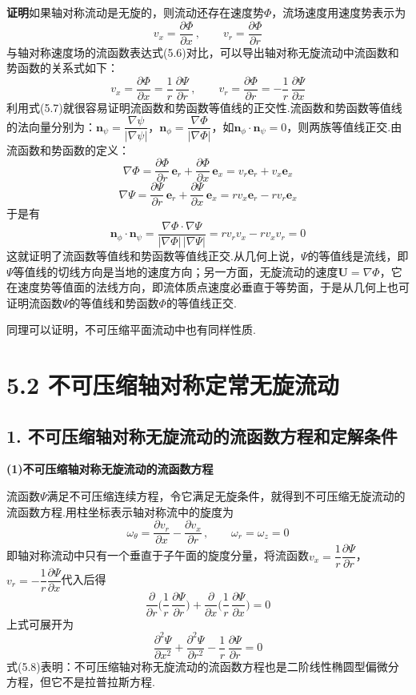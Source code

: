 \textbf{证明}\quad 如果轴对称流动是无旋的，则流动还存在速度势$\Phi$，流场速度用速度势表示为
\[
v_x=\frac{\partial\Phi}{\partial x}\,,\qquad v_r=\frac{\partial\Phi}{\partial r}
\]
与轴对称速度场的流函数表达式(5.6)对比，可以导出轴对称无旋流动中流函数和势函数的关系式如下：
\begin{equation*}
v_x=\frac{\partial\Phi}{\partial x}=\frac{1}{r}\,\frac{\partial\Psi}{\partial r}\,,\qquad v_r=\frac{\partial\Phi}{\partial r}=-\frac{1}{r}\,\frac{\partial\Psi}{\partial x}
\tag{5.7}
\end{equation*}
利用式(5.7)就很容易证明流函数和势函数等值线的正交性.流函数和势函数等值线的法向量分别为：$\boldsymbol{n}_\psi=\dfrac{\nabla\psi}{|\nabla\psi|}$，$\boldsymbol{n}_\phi=\dfrac{\nabla\Phi}{|\nabla\Phi|}$，如$\boldsymbol{n}_\phi\cdot\boldsymbol{n}_\psi=0$，则两族等值线正交.由流函数和势函数的定义：
\[
\nabla\Phi=\frac{\partial\Phi}{\partial r}\,\boldsymbol{e}_r+\frac{\partial\Phi}{\partial x}\,\boldsymbol{e}_x=v_r\boldsymbol{e}_r+v_x\boldsymbol{e}_x
\]
\[
\nabla\Psi=\frac{\partial\Psi}{\partial r}\,\boldsymbol{e}_r+\frac{\partial\Psi}{\partial x}\,\boldsymbol{e}_x=rv_x\boldsymbol{e}_r-rv_r\boldsymbol{e}_x
\]
于是有
\[
\boldsymbol{n}_\phi\cdot\boldsymbol{n}_\psi=\frac{\nabla\Phi\cdot\nabla\Psi}{|\nabla\Phi|\,|\nabla\Psi|}=rv_r v_x-rv_x v_r=0
\]
这就证明了流函数等值线和势函数等值线正交.从几何上说，$\Psi$的等值线是流线，即$\Psi$等值线的切线方向是当地的速度方向；另一方面，无旋流动的速度$\boldsymbol{U}=\nabla\Phi$，它在速度势等值面的法线方向，即流体质点速度必垂直于等势面，于是从几何上也可证明流函数$\Psi$的等值线和势函数$\Phi$的等值线正交.

同理可以证明，不可压缩平面流动中也有同样性质.

\section*{5.2  不可压缩轴对称定常无旋流动}

\subsection*{1. 不可压缩轴对称无旋流动的流函数方程和定解条件}

\textbf{(1)不可压缩轴对称无旋流动的流函数方程}

流函数$\Psi$满足不可压缩连续方程，令它满足无旋条件，就得到不可压缩无旋流动的流函数方程.用柱坐标表示轴对称流中的旋度为
\[
\omega_\theta=\frac{\partial v_r}{\partial x}-\frac{\partial v_x}{\partial r}\,,\qquad \omega_r=\omega_z=0
\]
即轴对称流动中只有一个垂直于子午面的旋度分量，将流函数$v_x=\dfrac{1}{r}\dfrac{\partial\Psi}{\partial r}$，$v_r=-\dfrac{1}{r}\dfrac{\partial\Psi}{\partial x}$代入后得
\[
\frac{\partial}{\partial r}\Big(\frac{1}{r}\,\frac{\partial\Psi}{\partial r}\Big)+\frac{\partial}{\partial x}\Big(\frac{1}{r}\,\frac{\partial\Psi}{\partial x}\Big)=0
\]
上式可展开为
\begin{equation*}
\frac{\partial^{2}\Psi}{\partial x^{2}}+\frac{\partial^{2}\Psi}{\partial r^{2}}-\frac{1}{r}\,\frac{\partial\Psi}{\partial r}=0
\tag{5.8}
\end{equation*}
式(5.8)表明：不可压缩轴对称无旋流动的流函数方程也是二阶线性椭圆型偏微分方程，但它不是拉普拉斯方程.

